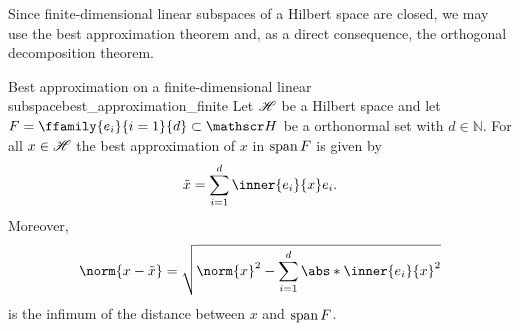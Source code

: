 Since finite-dimensional linear subspaces of a Hilbert space are closed, we may use the best approximation theorem and, as a direct consequence, the orthogonal decomposition theorem.
\begin{proposition}{Best approximation on a finite-dimensional linear subspace}{best_approximation_finite}
    Let \(\mathscr{H}\) be a Hilbert space and let \(F = \ffamily{e_i}{i=1}{d} \subset \hilbert\) be a orthonormal set with \(d \in \mathbb{N}\). For all \(x \in \mathscr{H}\) the best approximation of \(x\) in \(\operatorname{span}{F}\) is given by
    \begin{equation*}
        \tilde{x} = \sum_{i=1}^{d} \inner{e_i}{x}e_i.
    \end{equation*}
    Moreover,
    \begin{equation*}
        \norm{x - \tilde{x}} = \sqrt{\norm{x}^2 - \sum_{i = 1}^d \abs*{\inner{e_i}{x}}^2}
    \end{equation*}
    is the infimum of the distance between \(x\) and \(\operatorname{span}{F}\).
\end{proposition}
